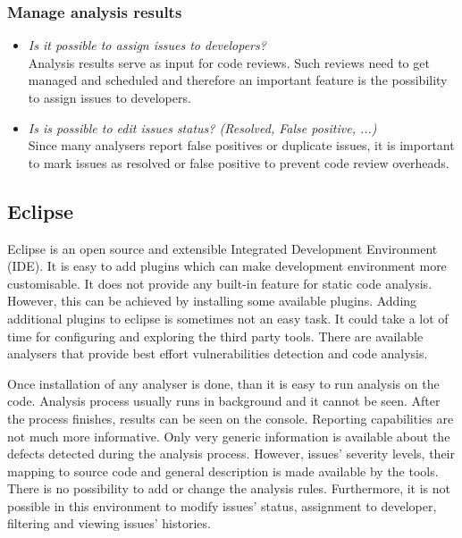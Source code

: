 \documentclass[conference]{IEEEtran}
\begin{document}
\subsubsection{Manage analysis results}
\label{subsubsec:evaluation_manage}
\begin{itemize}
	\item \textit{Is it possible to assign issues to developers?} \\
	Analysis results serve as input for code reviews. Such reviews need to get managed and scheduled and therefore an important feature is the possibility to assign issues to developers.
	
	\item \textit{Is is possible to edit issues status? (Resolved, False positive, ...)} \\
	Since many analysers report false positives or duplicate issues, it is important to mark issues as resolved or false positive to prevent code review overheads.
\end{itemize}


\subsection{Eclipse}
\label{subsec:evaluation_eclipse}

Eclipse is an open source and extensible Integrated Development Environment (IDE). It is easy to add plugins which can make development environment more customisable. It does not provide any built-in feature for static code analysis. However, this can be achieved by installing some available plugins. Adding additional plugins to eclipse is sometimes not an easy task. It could take a lot of time for configuring and exploring the third party tools. There are available analysers that provide best effort vulnerabilities detection and code analysis.

Once installation of any analyser is done, than it is easy to run analysis on the code. Analysis process usually runs in background and it cannot be seen. After the process finishes, results can be seen on the console. Reporting capabilities are not much more informative. Only very generic information is available about the defects detected during the analysis process. However, issues' severity levels, their mapping to source code and general description is made available by the tools. There is no possibility to add or change the analysis rules. Furthermore, it is not possible in this environment to modify issues' status, assignment to developer, filtering and viewing issues' histories.
\end{document}
